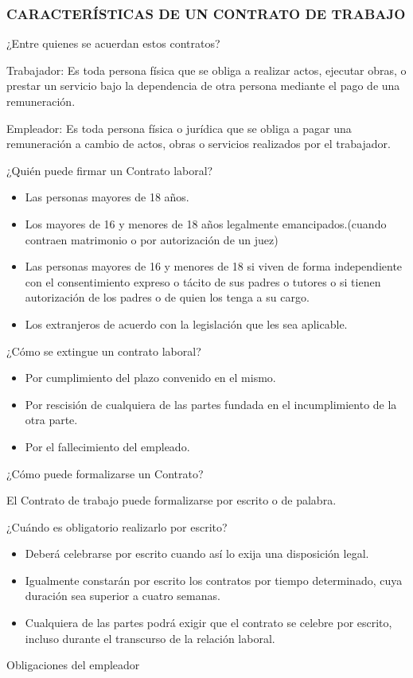 
\subsubsection*{CARACTERÍSTICAS DE UN CONTRATO DE TRABAJO}
¿Entre quienes se acuerdan estos contratos?

Trabajador: Es toda persona física que se obliga a realizar actos, ejecutar obras, o prestar un servicio bajo la dependencia de otra persona mediante el pago de una remuneración.

Empleador: Es toda persona física o jurídica que se obliga a pagar una remuneración a cambio de actos, obras o servicios realizados por el trabajador.

¿Quién puede firmar un Contrato laboral?

\begin{itemize}
  \item Las personas mayores de 18 años.
  \item Los mayores de 16 y menores de 18 años legalmente emancipados.(cuando contraen matrimonio o por autorización de un juez)
  \item Las personas mayores de 16 y menores de 18 si viven de forma independiente con el consentimiento expreso o tácito de sus padres o tutores o si tienen autorización de los padres o de quien los tenga a su cargo.
  \item Los extranjeros de acuerdo con la legislación que les sea aplicable.
\end{itemize}
¿Cómo se extingue un contrato laboral?

\begin{itemize}
  \item Por cumplimiento del plazo convenido en el mismo.
  \item Por rescisión de cualquiera de las partes fundada en el incumplimiento de la otra parte.
  \item Por el fallecimiento del empleado.
\end{itemize}
¿Cómo puede formalizarse un Contrato?

El Contrato de trabajo puede formalizarse por escrito o de palabra.

¿Cuándo es obligatorio realizarlo por escrito?

\begin{itemize}
  \item Deberá celebrarse por escrito cuando así lo exija una disposición legal.
  \item Igualmente constarán por escrito los contratos por tiempo determinado, cuya duración sea superior a cuatro semanas.
  \item Cualquiera de las partes podrá exigir que el contrato se celebre por escrito, incluso durante el transcurso de la relación laboral.
\end{itemize}
Obligaciones del empleador

